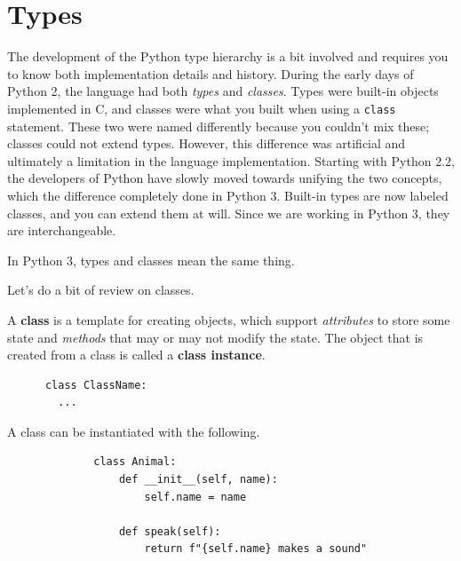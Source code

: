 \section{Types} 

  The development of the Python type hierarchy is a bit involved and requires you to know both implementation details and history. During the early days of Python 2, the language had both \textit{types} and \textit{classes}. Types were built-in objects implemented in C, and classes were what you built when using a \texttt{class} statement. These two were named differently because you couldn't mix these; classes could not extend types. However, this difference was artificial and ultimately a limitation in the language implementation. Starting with Python 2.2, the developers of Python have slowly moved towards unifying the two concepts, which the difference completely done in Python 3. Built-in types are now labeled classes, and you can extend them at will. Since we are working in Python 3, they are interchangeable.  

  \begin{theorem}
    \label{thm:types-and-classes}
    In Python 3, types and classes mean the same thing. 
  \end{theorem} 

  Let's do a bit of review on classes. 

  \begin{definition}[Class]
    \label{def:class}
 
    A \textbf{class} is a template for creating objects, which support \textit{attributes} to store some state and \textit{methods} that may or may not modify the state. The object that is created from a class is called a \textbf{class instance}. 

    \begin{lstlisting}
      class ClassName: 
        ...  
    \end{lstlisting}
  \end{definition}

  \begin{example}
    \label{ex:animal-class-definition}
    A class can be instantiated with the following. 

    \begin{figure}[H]
      \centering 
      \begin{lstlisting}
        class Animal: 
            def __init__(self, name):
                self.name = name
            
            def speak(self):
                return f"{self.name} makes a sound"
      \end{lstlisting} 
      \caption{} 
      \label{fig:animal_class}
    \end{figure}
  \end{example}  

